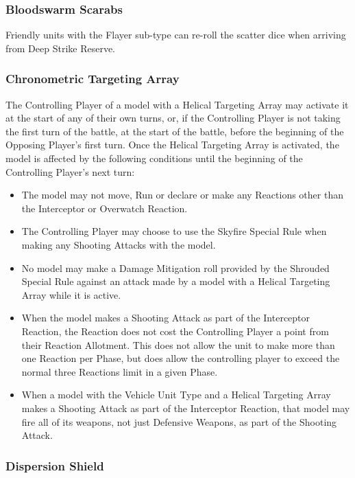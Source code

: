 \subsubsection{Bloodswarm Scarabs} \label{Bloodswarm Scarabs}

Friendly units with the Flayer sub-type can re-roll the scatter dice when arriving from Deep Strike Reserve. 

\subsubsection{Chronometric Targeting Array} \label{Chronometric Targeting Array}

The Controlling Player of a model with a Helical Targeting Array may activate it at the start of any of their own turns, or, if the Controlling Player is not taking the first turn of the battle, at the start of the battle, before the beginning of the Opposing Player’s first turn. Once the Helical Targeting Array is activated, the model is affected by the following conditions until the beginning of the Controlling Player’s next turn:

\begin{itemize}
	\item The model may not move, Run or declare or make any Reactions other than the Interceptor or Overwatch Reaction.
	\item The Controlling Player may choose to use the Skyfire Special Rule when making any Shooting Attacks with the model.
	\item No model may make a Damage Mitigation roll provided by the Shrouded Special Rule against an attack made by a model with a Helical Targeting Array while it is active.
	\item When the model makes a Shooting Attack as part of the Interceptor Reaction, the Reaction does not cost the Controlling Player a point from their Reaction Allotment. This does not allow the unit to make more than one Reaction per Phase, but does allow the controlling player to exceed the normal three Reactions limit in a given Phase.
	\item When a model with the Vehicle Unit Type and a Helical Targeting Array makes a Shooting Attack as part of the Interceptor Reaction, that model may fire all of its weapons, not just Defensive Weapons, as part of the Shooting Attack.
\end{itemize}

\subsubsection{Dispersion Shield} \label{Dispersion Shield}

